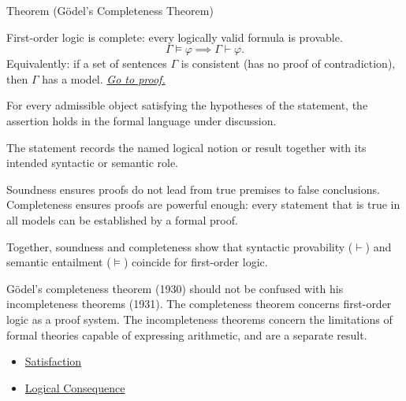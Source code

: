 
\begin{theorembox}{Theorem (G\"{o}del's Completeness Theorem)}
\begin{theorem}
\label{thm:godel-complete}
First-order logic is complete: every logically valid formula is provable.
\[
\Gamma \models \varphi \implies \Gamma \vdash \varphi.
\]
Equivalently: if a set of sentences $\Gamma$ is consistent (has no proof of
contradiction), then $\Gamma$ has a model.
\hyperref[prf:godel-complete]{\textit{Go to proof.}}
\end{theorem}
\end{theorembox}
\begin{remark*}
For every admissible object satisfying the hypotheses of the statement, the
assertion holds in the formal language under discussion.
\end{remark*}

\begin{remark*}[Interpretation]
The statement records the named logical notion or result together with its
intended syntactic or semantic role.
\end{remark*}


\begin{remark*}[Exposition]
Soundness ensures proofs do not lead from true premises to false conclusions.
Completeness ensures proofs are powerful enough: every statement that is true
in all models can be established by a formal proof.

Together, soundness and completeness show that syntactic provability ($\vdash$)
and semantic entailment ($\models$) coincide for first-order logic.
\end{remark*}

\begin{remark*}[Exposition]
G\"{o}del's completeness theorem (1930) should not be confused with his
incompleteness theorems (1931). The completeness theorem concerns first-order
logic as a proof system. The incompleteness theorems concern the limitations of
formal theories capable of expressing arithmetic, and are a separate result.
\end{remark*}

\begin{dependencies}
\begin{itemize}
  \item \hyperref[def:fol-satisfaction]{Satisfaction}
  \item \hyperref[def:log-consequence]{Logical Consequence}
\end{itemize}
\end{dependencies}
